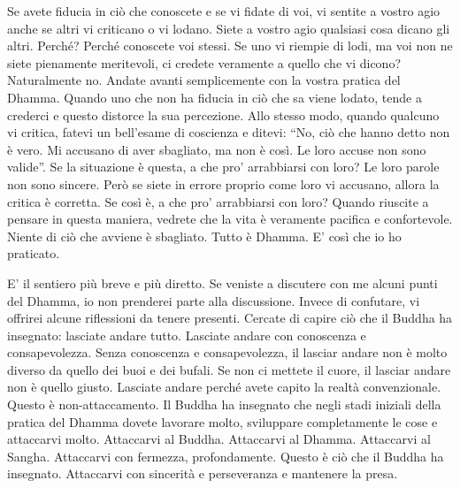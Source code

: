 Se avete fiducia in ciò che conoscete e se vi fidate di voi, vi sentite
a vostro agio anche se altri vi criticano o vi lodano. Siete a vostro
agio qualsiasi cosa dicano gli altri. Perché? Perché conoscete voi
stessi. Se uno vi riempie di lodi, ma voi non ne siete pienamente
meritevoli, ci credete veramente a quello che vi dicono? Naturalmente
no. Andate avanti semplicemente con la vostra pratica del Dhamma. Quando
uno che non ha fiducia in ciò che sa viene lodato, tende a crederci e
questo distorce la sua percezione. Allo stesso modo, quando qualcuno vi
critica, fatevi un bell'esame di coscienza e ditevi: ``No, ciò che hanno
detto non è vero. Mi accusano di aver sbagliato, ma non è così. Le loro
accuse non sono valide''. Se la situazione è questa, a che pro'
arrabbiarsi con loro? Le loro parole non sono sincere. Però se siete in
errore proprio come loro vi accusano, allora la critica è corretta. Se
così è, a che pro' arrabbiarsi con loro? Quando riuscite a pensare in
questa maniera, vedrete che la vita è veramente pacifica e confortevole.
Niente di ciò che avviene è sbagliato. Tutto è Dhamma. E' così che io ho
praticato.


E' il sentiero più breve e più diretto. Se veniste a discutere con me
alcuni punti del Dhamma, io non prenderei parte alla discussione. Invece
di confutare, vi offrirei alcune riflessioni da tenere presenti. Cercate
di capire ciò che il Buddha ha insegnato: lasciate andare tutto.
Lasciate andare con conoscenza e consapevolezza. Senza conoscenza e
consapevolezza, il lasciar andare non è molto diverso da quello dei buoi
e dei bufali. Se non ci mettete il cuore, il lasciar andare non è quello
giusto. Lasciate andare perché avete capito la realtà convenzionale.
Questo è non-attaccamento. Il Buddha ha insegnato che negli stadi
iniziali della pratica del Dhamma dovete lavorare molto, sviluppare
completamente le cose e attaccarvi molto. Attaccarvi al Buddha.
Attaccarvi al Dhamma. Attaccarvi al Sangha. Attaccarvi con fermezza,
profondamente. Questo è ciò che il Buddha ha insegnato. Attaccarvi con
sincerità e perseveranza e mantenere la presa.

